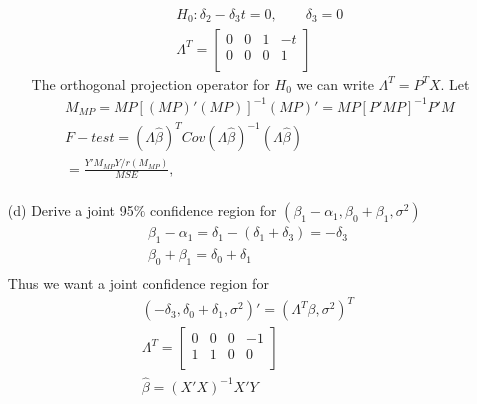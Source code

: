 \documentclass{homework}
\begin{document}
\begin{itemize}
\begin{itemize}
\[\begin{split}
    H_0: \delta_2 - \delta_3t= 0,\qquad \delta_3 = 0\\
    \Lambda^T = \begin{bmatrix}
           0 & 0& 1 & -t \\
           0 & 0& 0 & 1\\
         \end{bmatrix}
    \end{split}
    \]    
    The orthogonal projection operator for $H_0$ we can write $\Lambda^T = P^T X$. Let 
    \[ 
    \begin{split}
    M_{MP} = MP[(MP)'(MP)]^{-1} (MP)' = MP[P'MP]^{-1}P'M \\
    F-test = (\Lambda \hat{\beta})^TCov(\Lambda \hat{\beta})^{-1}(\Lambda \hat{\beta})\\
     = \frac{Y'M_{MP}Y/r(M_{MP})}{MSE},\\
    \end{split}
    \] 
    \end{itemize}
    
    \item[(d)] Derive a joint 95$\%$ confidence region for $(\beta_1-\alpha_1, \beta_0+\beta_1, \sigma^2)$\\
     \[ 
    \begin{split}
    \beta_1-\alpha_1 = \delta_1 - (\delta_1+\delta_3) = -\delta_3\\
    \beta_0 + \beta_1 = \delta_0 + \delta_1\\
    \end{split}
    \]    
    Thus we want a joint confidence region for 
     \[ 
    \begin{split}
    (-\delta_3, \delta_0+\delta_1, \sigma^2)' = (\Lambda^T\beta, \sigma^2)^T\\
    \Lambda^T = \begin{bmatrix}
           0 & 0& 0 & -1 \\
           1 & 1 & 0 & 0\\
         \end{bmatrix}\\
    \hat{\beta} = (X'X)^{-1}X'Y
    \end{split}
    \]     
    

\end{itemize}
\end{document}
